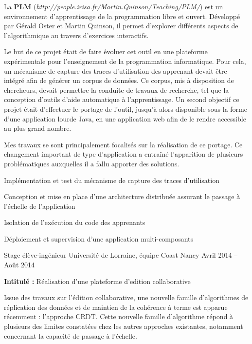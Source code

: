 \documentclass[12pt, a4paper]{awesome-cv}
\newcommand{\customlink}[2]{
  \href{#2}{\textbf{#1} (\emph{#2})}
}
\begin{document}
\begin{cventries}
  \begin{cvparagraph}
    La \customlink{PLM}{http://people.irisa.fr/Martin.Quinson/Teaching/PLM/} est un environnement d’apprentissage de la programmation libre et ouvert.
    Développé par Gérald Oster et Martin Quinson, il permet d’explorer différents aspects de l’algorithmique au travers d’exercices interactifs.

    Le but de ce projet était de faire évoluer cet outil en une plateforme expérimentale pour l'enseignement de la programmation informatique.
    Pour cela, un mécanisme de capture des traces d'utilisation des apprenant devait être intégré afin de générer un corpus de données.
    Ce corpus, mis à disposition de chercheurs, devait permettre la conduite de travaux de recherche, tel que la conception d'outils d'aide automatique à l'apprentissage.
    Un second objectif ce projet était d'effectuer le portage de l'outil, jusqu'à alors disponible sous la forme d'une application lourde Java, en une application web afin de le rendre accessible au plus grand nombre.

    Mes travaux se sont principalement focalisés sur la réalisation de ce portage.
    Ce changement important de type d'application a entraîné l'apparition de plusieurs problématiques auxquelles il a fallu apporter des solutions.

    \begin{tightemize}
    \item Implémentation et test du mécanisme de capture des traces d'utilisation
    \item Conception et mise en place d'une architecture distribuée assurant le passage à l'échelle de l'application
    \item Isolation de l'exécution du code des apprenants
    \item Déploiement et supervision d'une application multi-composants
    \end{tightemize}
  \end{cvparagraph}

\cventry
  {Stage élève-ingénieur} %
  {Université de Lorraine, équipe Coast} %
  {Nancy} %
  {Avril 2014 – Août 2014} %
  {
    \begin{cvitems} %
      \item {\textbf{Intitulé :}  Réalisation d’une plateforme d’edition collaborative}
    \end{cvitems}
  }

  \begin{cvparagraph}
    Issue des travaux sur l'édition collaborative, une nouvelle famille d'algorithmes de réplication des données et de maintien de la cohérence à terme est apparue récemment : l'approche \acf{CRDT}.
    Cette nouvelle famille d'algorithme répond à plusieurs des limites constatées chez les autres approches existantes, notamment concernant la capacité de passage à l'échelle.


\end{cvparagraph}
\end{cventries}
\end{document}
